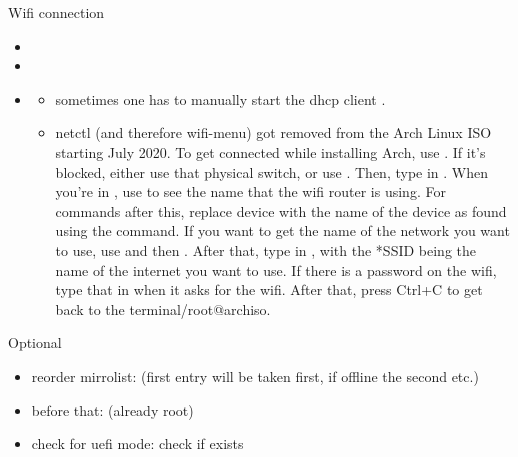 \begin{frame}{Wifi connection}
  \begin{itemize}
    \item {}
    \item {}
    \item {}
    \begin{Sidenote}
      \begin{itemize}
        \scriptsize
        \item sometimes one has to manually start the dhcp client .
        \item netctl (and therefore wifi-menu) got removed from the Arch Linux ISO starting July 2020. To get connected while installing Arch, use . If it's blocked, either use that physical switch, or use . Then, type in . When you're in , use  to see the name that the wifi router is using. For commands after this, replace device with the name of the device as found using the  command. If you want to get the name of the network you want to use, use  and then . After that, type in , with the *SSID being the name of the internet you want to use. If there is a password on the wifi, type that in when it asks for the wifi. After that, press Ctrl+C to get back to the terminal/root@archiso.
      \end{itemize}
    \end{Sidenote}
  \end{itemize}
\end{frame}

\begin{frame}[fragile]{Optional}
  \begin{itemize}
    \item reorder mirrolist:  (first entry will be taken first, if offline the second etc.)
    \item before that:  (already root)
    \item check for uefi mode:  check if exists
  \end{itemize}
\end{frame}

